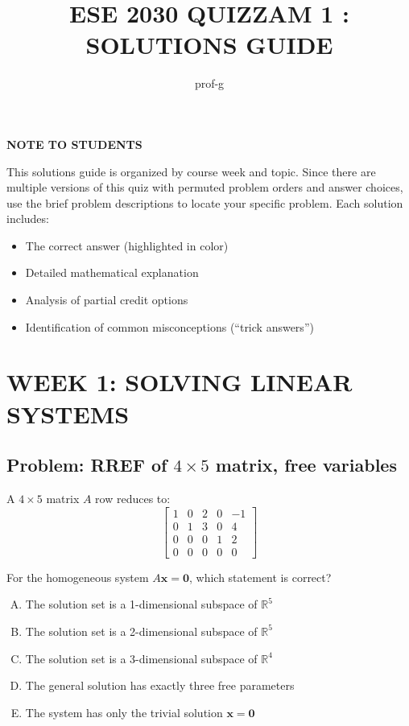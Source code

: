 \documentclass[12pt]{amsart}
\title{ESE 2030 QUIZZAM 1 : SOLUTIONS GUIDE}
\author{prof-g}
\begin{document}
\maketitle

\begin{center}
{\bf NOTE TO STUDENTS}
\end{center}

This solutions guide is organized by course week and topic. Since there are multiple versions of this quiz with permuted problem orders and answer choices, use the brief problem descriptions to locate your specific problem. Each solution includes:
\begin{itemize}
\item The correct answer (highlighted in color)
\item Detailed mathematical explanation
\item Analysis of partial credit options
\item Identification of common misconceptions (``trick answers'')
\end{itemize}

\newpage

\section*{WEEK 1: SOLVING LINEAR SYSTEMS}

\subsection*{Problem: RREF of $4 \times 5$ matrix, free variables}

A $4 \times 5$ matrix $A$ row reduces to:
$$\begin{bmatrix} 1 & 0 & 2 & 0 & -1 \\ 0 & 1 & 3 & 0 & 4 \\ 0 & 0 & 0 & 1 & 2 \\ 0 & 0 & 0 & 0 & 0 \end{bmatrix}$$

For the homogeneous system $A\mathbf{x} = \mathbf{0}$, which statement is correct?

\begin{enumerate}[(A)]
\item The solution set is a 1-dimensional subspace of $\mathbb{R}^5$
\item The solution set is a 2-dimensional subspace of $\mathbb{R}^5$
\item The solution set is a 3-dimensional subspace of $\mathbb{R}^4$
\item The general solution has exactly three free parameters
\item The system has only the trivial solution $\mathbf{x} = \mathbf{0}$
\end{enumerate}
\end{document}
